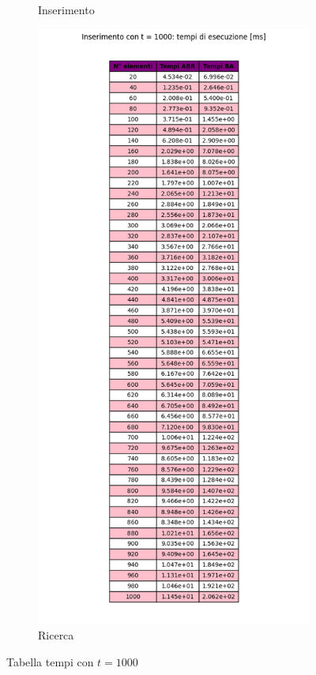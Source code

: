 \begin{figure}[H]
\begin{subfigure}[b]{0.49\textwidth}
        \caption{Inserimento}
        \label{fig:tableinserttimet1000}
    \end{subfigure}
    \hfill
    \begin{subfigure}[b]{0.49\textwidth}
        \centering
        \includegraphics[width=\textwidth]{tables/search-ms-t1000.png}
        \caption{Ricerca}
        \label{fig:tablesearchtimet1000}
    \end{subfigure}
    \caption{Tabella tempi con $t=1000$}
    \label{fig:tabletimest1000}
\end{figure}


